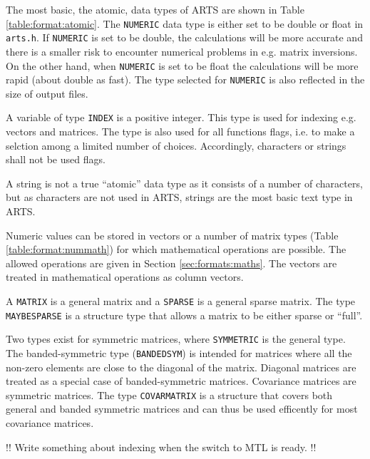  \label{sec:formats:atomic}

 The most basic, the atomic, data types of ARTS are shown in Table
 \ref{table:format:atomic}. The \verb|NUMERIC| data type is either
 set to be double or float in \verb|arts.h|. If \verb|NUMERIC| is set
 to be double, the calculations will be more accurate and there is a
 smaller risk to encounter numerical problems in e.g. matrix inversions.
 On the other hand, when \verb|NUMERIC| is set to be float the calculations
 will be more rapid (about double as fast). The type selected for
 \verb|NUMERIC| is also reflected in the size of output files.
 
 A variable of type \verb|INDEX| is a positive integer. This type is
 used for indexing e.g. vectors and matrices. The type is also used
 for all functions flags, i.e. to make a selction among a limited number of
 choices. Accordingly, characters or strings shall not be used flags. 

 A string is not a true ``atomic'' data type as it consists of a number
 of characters, but as characters are not used in ARTS, strings are
 the most basic text type in ARTS.
  


 \label{sec:formats:nummath}
 
 Numeric values can be stored in vectors or a number of matrix types
 (Table \ref{table:format:nummath}) for which mathematical operations
 are possible. The allowed operations are given in Section 
 \ref{sec:formats:maths}.
 The vectors are treated in mathematical operations as column vectors.
 
 A \verb|MATRIX| is a general matrix and a \verb|SPARSE| is a general
 sparse matrix. The type \verb|MAYBESPARSE| is a structure type that
 allows a matrix to be either sparse or ``full''. 
 
 Two types exist for symmetric matrices, where \verb|SYMMETRIC| is the
 general type. The banded-symmetric type (\verb|BANDEDSYM|) is
 intended for matrices where all the non-zero elements are close to
 the diagonal of the matrix. Diagonal matrices are treated as a
 special case of banded-symmetric matrices. Covariance matrices are
 symmetric matrices. The type \verb|COVARMATRIX| is a structure that
 covers both general and banded symmetric matrices and can thus be
 used efficently for most covariance matrices.

 !! Write something about indexing when the switch to MTL is ready. !!


